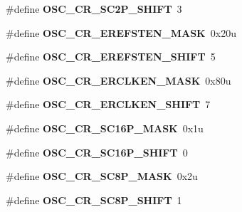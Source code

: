 \begin{DoxyCompactItemize}
\item 
\#define {\bfseries O\+S\+C\+\_\+\+C\+R\+\_\+\+S\+C2\+P\+\_\+\+S\+H\+I\+FT}~3\hypertarget{group__OSC__Register__Masks_ga0ec9adaf1ca3ec309f1a2c2fd37d3f4d}{}\label{group__OSC__Register__Masks_ga0ec9adaf1ca3ec309f1a2c2fd37d3f4d}

\item 
\#define {\bfseries O\+S\+C\+\_\+\+C\+R\+\_\+\+E\+R\+E\+F\+S\+T\+E\+N\+\_\+\+M\+A\+SK}~0x20u\hypertarget{group__OSC__Register__Masks_ga3024913f44011d333c6f48ddb00fbf9d}{}\label{group__OSC__Register__Masks_ga3024913f44011d333c6f48ddb00fbf9d}

\item 
\#define {\bfseries O\+S\+C\+\_\+\+C\+R\+\_\+\+E\+R\+E\+F\+S\+T\+E\+N\+\_\+\+S\+H\+I\+FT}~5\hypertarget{group__OSC__Register__Masks_gac1b9c5d7f156f1792255204dae816aba}{}\label{group__OSC__Register__Masks_gac1b9c5d7f156f1792255204dae816aba}

\item 
\#define {\bfseries O\+S\+C\+\_\+\+C\+R\+\_\+\+E\+R\+C\+L\+K\+E\+N\+\_\+\+M\+A\+SK}~0x80u\hypertarget{group__OSC__Register__Masks_gab96140627de270278cbdfc81fbef63fc}{}\label{group__OSC__Register__Masks_gab96140627de270278cbdfc81fbef63fc}

\item 
\#define {\bfseries O\+S\+C\+\_\+\+C\+R\+\_\+\+E\+R\+C\+L\+K\+E\+N\+\_\+\+S\+H\+I\+FT}~7\hypertarget{group__OSC__Register__Masks_ga56f4aa6f215268327accda5434671187}{}\label{group__OSC__Register__Masks_ga56f4aa6f215268327accda5434671187}

\item 
\#define {\bfseries O\+S\+C\+\_\+\+C\+R\+\_\+\+S\+C16\+P\+\_\+\+M\+A\+SK}~0x1u\hypertarget{group__OSC__Register__Masks_ga8c73f0e22875a434f8031986a9e5f8b4}{}\label{group__OSC__Register__Masks_ga8c73f0e22875a434f8031986a9e5f8b4}

\item 
\#define {\bfseries O\+S\+C\+\_\+\+C\+R\+\_\+\+S\+C16\+P\+\_\+\+S\+H\+I\+FT}~0\hypertarget{group__OSC__Register__Masks_ga4bcf6535cd7e7c4ff935f6b544ca3f9a}{}\label{group__OSC__Register__Masks_ga4bcf6535cd7e7c4ff935f6b544ca3f9a}

\item 
\#define {\bfseries O\+S\+C\+\_\+\+C\+R\+\_\+\+S\+C8\+P\+\_\+\+M\+A\+SK}~0x2u\hypertarget{group__OSC__Register__Masks_ga1a5a0db08efaf66c34caf98136cbec11}{}\label{group__OSC__Register__Masks_ga1a5a0db08efaf66c34caf98136cbec11}

\item 
\#define {\bfseries O\+S\+C\+\_\+\+C\+R\+\_\+\+S\+C8\+P\+\_\+\+S\+H\+I\+FT}~1\hypertarget{group__OSC__Register__Masks_ga6f17376a1571a200e55cac51d1358503}{}\label{group__OSC__Register__Masks_ga6f17376a1571a200e55cac51d1358503}


\end{DoxyCompactItemize}
